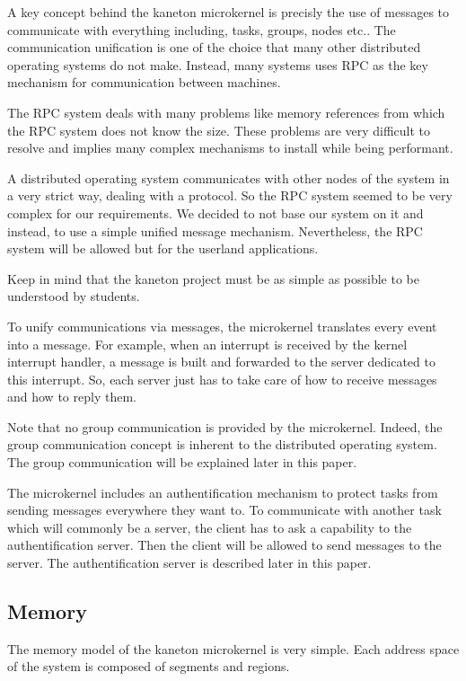 \begin{multicols}{2}
A key concept behind the kaneton microkernel is precisly the use of messages
to communicate with everything including, tasks, groups, nodes etc..
The communication unification is one of the choice that many other distributed
operating systems do not make. Instead, many systems uses RPC as the key
mechanism for communication between machines.

The RPC system deals with many problems like memory references from which the
RPC system does not know the size. These problems are very difficult to
resolve and implies many complex mechanisms to install while being performant.

A distributed operating system communicates with other nodes of the system in
a very strict way, dealing with a protocol. So the RPC system seemed to be very
complex for our requirements. We decided to not base our system on it and
instead, to use a simple unified message mechanism. Nevertheless, the RPC
system will be allowed but for the userland applications.

Keep in mind that the kaneton project must be as simple as possible to be
understood by students.

To unify communications via messages, the microkernel translates every event
into a message. For example, when an interrupt is received by the kernel
interrupt handler, a message is built and forwarded to the server dedicated
to this interrupt. So, each server just has to take care of how to receive
messages and how to reply them.

Note that no group communication is provided by the microkernel. Indeed, the
group communication concept is inherent to the distributed operating system.
The group communication will be explained later in this paper.

The microkernel includes an authentification mechanism to protect tasks from
sending messages everywhere they want to. To communicate with another task
which will commonly be a server, the client has to ask a capability to
the authentification server. Then the client will be allowed to send messages
to the server. The authentification server is described later in this paper.

\subsection{Memory}

The memory model of the kaneton microkernel is very simple. Each address space
of the system is composed of segments and regions.


\end{multicols}

